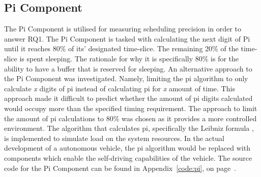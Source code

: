 
\subsection{Pi Component}
\label{section:exp-units-pi}
The Pi Component is utilised for measuring scheduling precision in order to answer RQ1. The Pi Component is tasked with calculating the next digit of Pi until it reaches 80\% of its' designated time-slice. The remaining 20\% of the time-slice is spent sleeping. The rationale for why it is specifically 80\% is for the ability to have a buffer that is reserved for sleeping. An alternative approach to the Pi Component was investigated. Namely, limiting the pi algorithm to only calculate \textit{x} digits of pi instead of calculating pi for \textit{x} amount of time. This approach made it difficult to predict whether the amount of pi digits calculated would occupy more than the specified timing requirement. The approach to limit the amount of pi calculations to 80\% was chosen as it provides a more controlled environment. The algorithm that calculates pi, specifically the Leibniz formula \cite{leibniz}, is implemented to simulate load on the system resources. In the actual development of a autonomous vehicle, the pi algorithm would be replaced with components which enable the self-driving capabilities of the vehicle. The source code for the Pi Component can be found in Appendix~\ref{code:pi}, on page~\pageref{code:pi}.  



